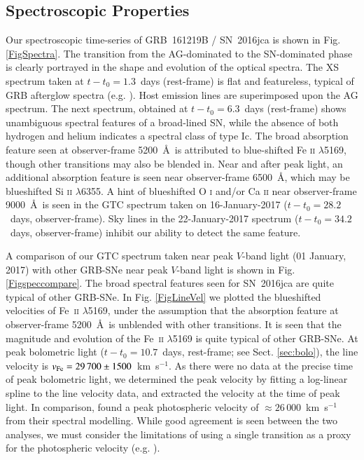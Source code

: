 \documentclass[traditabstract,longauth]{aa}
\begin{document}
\subsection{Spectroscopic Properties}


   
   

   
      
   
   
Our spectroscopic time-series of GRB~161219B / SN~2016jca is shown in Fig. \ref{FigSpectra}.  The transition from the AG-dominated to the SN-dominated phase is clearly portrayed in the shape and evolution of the optical spectra.  The XS spectrum taken at $t-t_0=1.3$~days (rest-frame) is flat and featureless, typical of GRB afterglow spectra (e.g. \citealt{Fynbo09}).  Host emission lines are superimposed upon the AG spectrum.  The next spectrum, obtained at $t-t_0=6.3$~days (rest-frame) shows unambiguous spectral features of a broad-lined SN, while the absence of both hydrogen and helium indicates a spectral class of type Ic. The broad absorption feature seen at observer-frame 5200~\AA~is attributed to blue-shifted Fe \textsc{ii} $\lambda$5169, though other transitions may also be blended in.  Near and after peak light, an additional absorption feature is seen near observer-frame 6500~\AA, which may be blueshifted Si \textsc{ii} $\lambda$6355.  A hint of blueshifted O \textsc{i} and/or Ca \textsc{ii} near observer-frame 9000~\AA~is seen in the GTC spectrum taken on 16-January-2017 ($t-t_0=28.2$~days, observer-frame).  Sky lines in the 22-January-2017 spectrum ($t-t_0=34.2$~days, observer-frame) inhibit our ability to detect the same feature.

A comparison of our GTC spectrum taken near peak $V$-band light  (01 January, 2017) with other GRB-SNe near peak $V$-band light is shown in Fig. \ref{Figspeccompare}.  The broad spectral features seen for SN~2016jca are quite typical of other GRB-SNe.   In Fig. \ref{FigLineVel} we plotted the blueshifted velocities of Fe~\textsc{ii} $\lambda$5169, under the assumption that the absorption feature at observer-frame 5200~\AA~is unblended with other transitions.  It is seen that the magnitude and evolution of the Fe~\textsc{ii} $\lambda$5169 is quite typical of other GRB-SNe.  At peak bolometric light ($t-t_0 = 10.7$~days, rest-frame; see Sect. \ref{sec:bolo}), the line velocity is $v_{\rm Fe} = 29\,700 \pm 1500$~km~s$^{-1}$.  As there were no data at the precise time of peak bolometric light, we determined the peak velocity by fitting a log-linear spline to the line velocity data, and extracted the velocity at the time of peak light. In comparison, \citet{Ashall17} found a peak photospheric velocity of $\approx 26\,000$~km~s$^{-1}$ from their spectral modelling.  While good agreement is seen between the two analyses, we must consider the limitations of using a single transition as a proxy for the photospheric velocity (e.g. \citealt{Modjaz16}).
 
\end{document}
